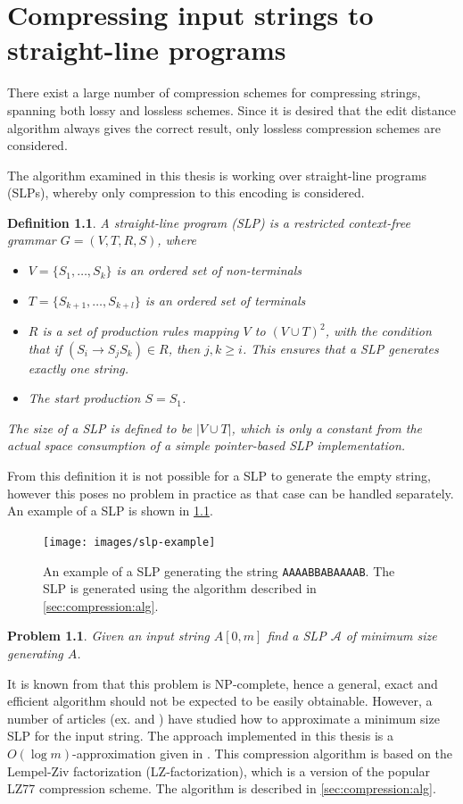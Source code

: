 \documentclass[twoside,11pt,openright]{report}
\newcommand{\str}[3]{#1[#2, #3]}
\newcommand{\SLP}[1] {\mathcal{#1}}
\newtheorem{mydef}{Definition}
\newtheorem{problem}{Problem}
\begin{document}
\chapter{Compressing input strings to straight-line programs}
\label{ch:compressing-strings}
There exist a large number of compression schemes for compressing strings, spanning both lossy and lossless schemes. Since it is desired that the edit distance algorithm always gives the correct result, only lossless compression schemes are considered.

The algorithm examined in this thesis is working over straight-line programs (SLPs), whereby only compression to this encoding is considered.
\begin{mydef}
  \label{def:slp}
  A straight-line program (SLP) is a restricted context-free grammar $G = (V, T, R, S)$, where
  \begin{itemize}
    \item $V = \{ S_1, \dots, S_k\}$ is an ordered set of non-terminals
    \item $T = \{ S_{k + 1}, \dots, S_{k + l} \}$ is an ordered set of terminals
    \item $R$ is a set of production rules mapping $V$ to $(V \cup T)^2$, with the condition that if $(S_i \to S_jS_k) \in R$, then $j,k \geq i$. This ensures that a SLP generates exactly one string.
    \item The start production $S = S_1$.
  \end{itemize}
  The size of a SLP is defined to be $|V \cup T|$, which is only a constant from the actual space consumption of a simple pointer-based SLP implementation.
\end{mydef}
From this definition it is not possible for a SLP to generate the empty string, however this poses no problem in practice as that case can be handled separately. An example of a SLP is shown in \cref{fig:slp-example}.
\begin{figure}[!htb]
  \centering
  \texttt{[image: images/slp-example]}
  \caption{An example of a SLP generating the string \texttt{AAAABBABAAAAB}. The SLP is generated using the algorithm described in \cref{sec:compression:alg}.}
  \label{fig:slp-example}
\end{figure}

\begin{problem}
  \label{compression:problem:minimum-slp}
  Given an input string $\str{A}{0}{m}$ find a SLP $\SLP{A}$ of minimum size generating $A$.
\end{problem}
It is known from \cite[p. 212]{Rytter2003211} that this problem is NP-complete, hence a general, exact and efficient algorithm should not be expected to be easily obtainable. However, a number of articles (ex. \cite{Rytter2003211} and \cite{Sakamoto2005416}) have studied how to approximate a minimum size SLP for the input string. The approach implemented in this thesis is a $O(\log{m})$-approximation given in \cite{Rytter2003211}. This compression algorithm is based on the Lempel-Ziv factorization (LZ-factorization), which is a version of the popular LZ77 compression scheme. The algorithm is described in \cref{sec:compression:alg}.
\end{document}
